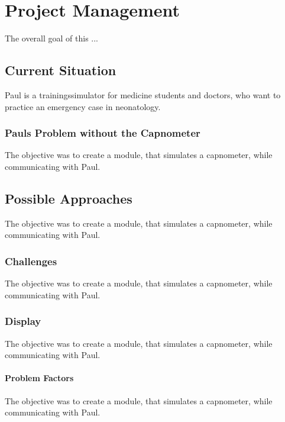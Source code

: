 \documentclass[12pt]{article}
\begin{document}
\section{Project Management}

The overall goal of this ...


\subsection{Current Situation}

Paul is a trainingssimulator for medicine students and doctors, who want to practice
an emergency case in neonatology.


\subsubsection{Pauls Problem without the Capnometer}

The objective was to create a module, that simulates a capnometer, while communicating
with Paul.


\subsection{Possible Approaches}

The objective was to create a module, that simulates a capnometer, while communicating
with Paul.


\subsubsection{Challenges}

The objective was to create a module, that simulates a capnometer, while communicating
with Paul.


\subsubsection{Display}

The objective was to create a module, that simulates a capnometer, while communicating
with Paul.


\paragraph{Problem Factors}

The objective was to create a module, that simulates a capnometer, while communicating
with Paul.
\end{document}
